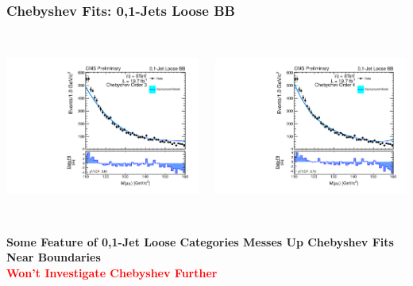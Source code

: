 \documentclass{beamer}
\begin{document}
\begin{frame}
\frametitle{Chebyshev Fits: 0,1-Jets Loose BB}
\vspace{-1em}
\begin{columns}[c]
 \column{60mm}
    \begin{center}
      \includegraphics[height=55mm]{2013-10-04SystematicBiasStudy1/order_Shape_Jets01FailPtG10BB_Chebychev3}
    \end{center}
 \column{60mm}
    \begin{center}
      \includegraphics[height=55mm]{2013-10-04SystematicBiasStudy1/order_Shape_Jets01FailPtG10BB_Chebychev4}
    \end{center}
\end{columns}
\begin{center}
\bf
Some Feature of 0,1-Jet Loose Categories Messes Up Chebyshev Fits Near Boundaries
\\
\textcolor{red}{Won't Investigate Chebyshev Further}

\end{center}
\end{frame}
\end{document}
